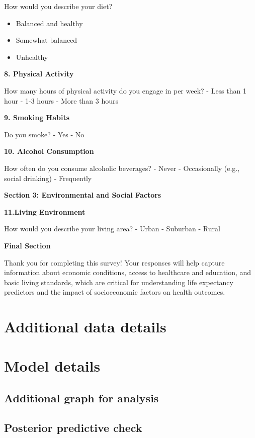 \documentclass[
  letterpaper,
  DIV=11,
  numbers=noendperiod]{scrartcl}
\providecommand{\tightlist}{%
  \setlength{\itemsep}{0pt}\setlength{\parskip}{0pt}}\usepackage{longtable,booktabs,array}
\begin{document}
How would you describe your diet?

\begin{itemize}
\tightlist
\item
  Balanced and healthy
\item
  Somewhat balanced
\item
  Unhealthy
\end{itemize}

\textbf{8. Physical Activity}

How many hours of physical activity do you engage in per week? - Less
than 1 hour - 1-3 hours - More than 3 hours

\textbf{9. Smoking Habits}

Do you smoke? - Yes - No

\textbf{10. Alcohol Consumption}

How often do you consume alcoholic beverages? - Never - Occasionally
(e.g., social drinking) - Frequently

\textbf{Section 3: Environmental and Social Factors}

\textbf{11.Living Environment}

How would you describe your living area? - Urban - Suburban - Rural

\textbf{Final Section}

Thank you for completing this survey! Your responses will help capture
information about economic conditions, access to healthcare and
education, and basic living standards, which are critical for
understanding life expectancy predictors and the impact of socioeconomic
factors on health outcomes.

\section{Additional data details}\label{additional-data-details}

\section{Model details}\label{sec-model-details}

\subsection{Additional graph for
analysis}\label{additional-graph-for-analysis}

\subsection{Posterior predictive
check}\label{posterior-predictive-check}
\end{document}
